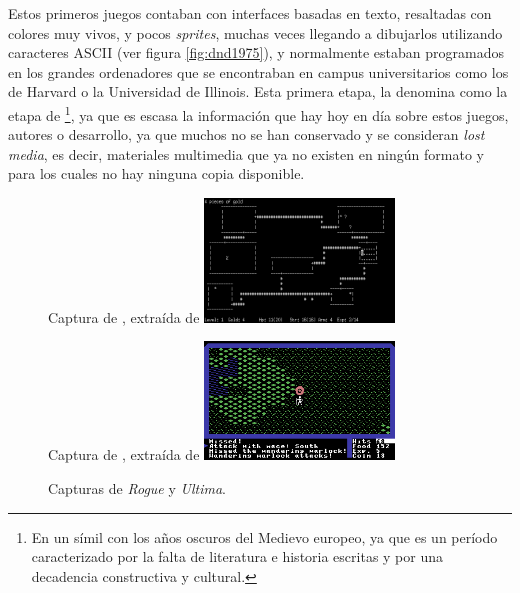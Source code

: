 \smallskip

Estos primeros juegos contaban con interfaces basadas en texto, resaltadas con colores muy vivos, y pocos \textit{sprites}, muchas veces llegando a dibujarlos utilizando caracteres ASCII (ver figura \ref{fig:dnd1975}), y normalmente estaban programados en los grandes ordenadores que se encontraban en campus universitarios como los de Harvard o la Universidad de Illinois. Esta primera etapa, \cite{barton2008dungeons} la denomina como la etapa de \footnote{En un símil con los años oscuros del Medievo europeo, ya que es un período caracterizado por la falta de literatura e historia escritas y por una decadencia constructiva y cultural.}, ya que es escasa la información que hay hoy en día sobre estos juegos, autores o desarrollo, ya que muchos no se han conservado y se consideran \textit{lost media}, es decir, materiales multimedia que ya no existen en ningún formato y para los cuales no hay ninguna copia disponible.

\smallskip

\begin{figure}[t]
\centering
\begin{SubFloat}
{\label{fig:rogue}%
	Captura de \cite{rogue}, extraída de \cite{rogueimg}}%
	\includegraphics[width=0.45\textwidth]{Imagenes/Bitmap/rogue}%
\end{SubFloat}
\qquad
\begin{SubFloat}
{\label{fig:ultima}%
	Captura de \cite{ultima}, extraída de \cite{ultimaimg}}%
	\includegraphics[width=0.45\textwidth]{Imagenes/Bitmap/ultima}%
\end{SubFloat}
\caption{Capturas de \textit{Rogue} y \textit{Ultima}. \label{fig:rogueultima}}
\end{figure}

